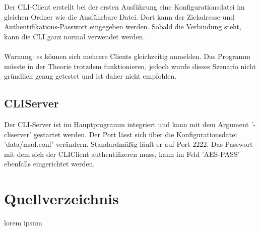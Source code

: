\documentclass[12pt,a4paper]{report}
\begin{document}
Der CLI-Client erstellt bei der ersten Ausführung eine Konfigurationsdatei im gleichen Ordner wie die Ausführbare Datei. Dort kann der Zieladresse und Authentifikations-Passwort eingegeben werden. Sobald die Verbindung steht, kann die CLI ganz normal verwendet werden.\\\\
Warnung: es können sich mehrere Clients gleichzeitig anmelden. Das Programm müsste in der Theorie trotzdem funktionieren, jedoch wurde dieses Szenario nicht gründlich genug getestet und ist daher nicht empfohlen.

\chapter{CLIServer}

Der CLI-Server ist im Hauptprogramm integriert und kann mit dem Argument '-cliserver' gestartet werden. Der Port lässt sich über die Konfigurationsdatei 'data/mad.conf' verändern. Standardmäßig läuft er auf Port 2222. Das Passwort mit dem sich der CLIClient authentifizeren muss, kann im Feld 'AES-PASS' ebenfalls eingerichtet werden.

\part{Quellverzeichnis}
lorem ipsum
\end{document}
